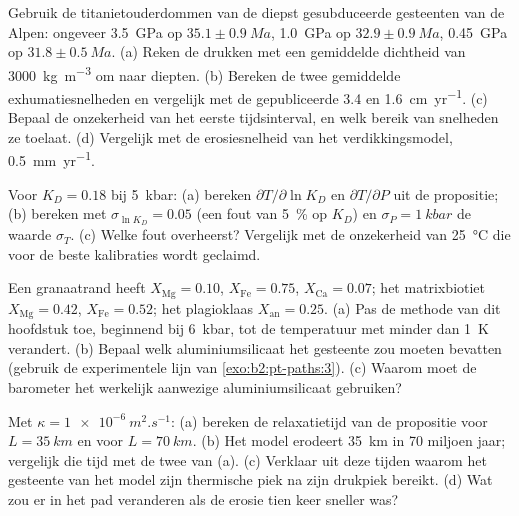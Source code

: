 \begin{exercise}[$\star\star$]\label{exo:b2:pt-paths:8}
Gebruik de titanietouderdommen van de diepst gesubduceerde gesteenten van de Alpen: ongeveer \qty{3.5}{GPa} op
$35.1 \pm \qty{0.9}{Ma}$, \qty{1.0}{GPa} op $32.9 \pm \qty{0.9}{Ma}$, \qty{0.45}{GPa} op
$31.8 \pm \qty{0.5}{Ma}$. (a) Reken de drukken met een gemiddelde dichtheid van \qty{3000}{kg.m^{-3}} om
naar diepten. (b) Bereken de twee gemiddelde exhumatiesnelheden en vergelijk met de
gepubliceerde 3.4 en \qty{1.6}{cm.yr^{-1}}. (c) Bepaal de onzekerheid van het eerste
tijdsinterval, en welk bereik van snelheden ze toelaat. (d) Vergelijk met de erosiesnelheid van
het verdikkingsmodel, \qty{0.5}{mm.yr^{-1}}.
\end{exercise}

\begin{exercise}[$\star\star$]\label{exo:b2:pt-paths:9}
Voor $K_D = 0.18$ bij \qty{5}{kbar}: (a) bereken $\partial T/\partial\ln K_D$ en
$\partial T/\partial P$ uit de propositie; (b) bereken met $\sigma_{\ln K_D} = 0.05$ (een
fout van \qty{5}{\percent} op $K_D$) en $\sigma_P = \qty{1}{kbar}$ de waarde $\sigma_T$.
(c) Welke fout overheerst? Vergelijk met de onzekerheid van \qty{25}{\celsius} die voor
de beste kalibraties wordt geclaimd.
\end{exercise}

\begin{exercise}[$\star\star\star$]\label{exo:b2:pt-paths:10}
Een granaatrand heeft $X_{\text{Mg}} = 0.10$, $X_{\text{Fe}} = 0.75$, $X_{\text{Ca}} = 0.07$;
het matrixbiotiet $X_{\text{Mg}} = 0.42$, $X_{\text{Fe}} = 0.52$; het plagioklaas
$X_{\text{an}} = 0.25$. (a) Pas de methode van dit hoofdstuk toe, beginnend bij \qty{6}{kbar},
tot de temperatuur met minder dan \qty{1}{K} verandert. (b) Bepaal welk aluminiumsilicaat
het gesteente zou moeten bevatten (gebruik de experimentele lijn van \cref{exo:b2:pt-paths:3}). (c) Waarom moet de barometer
het werkelijk aanwezige aluminiumsilicaat gebruiken?
\end{exercise}

\begin{exercise}[$\star\star\star$]\label{exo:b2:pt-paths:11}
Met $\kappa = \qty{1e-6}{m^2.s^{-1}}$: (a) bereken de relaxatietijd van de
propositie voor $L = \qty{35}{km}$ en voor $L = \qty{70}{km}$. (b) Het model erodeert
\qty{35}{km} in 70 miljoen jaar; vergelijk die tijd met de twee van (a). (c) Verklaar
uit deze tijden waarom het gesteente van het model zijn thermische piek na zijn
drukpiek bereikt. (d) Wat zou er in het pad veranderen als de erosie tien keer sneller was?
\end{exercise}

